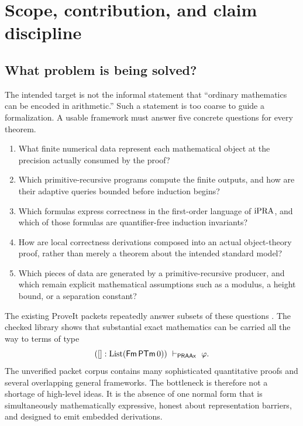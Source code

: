 \section{Scope, contribution, and claim discipline}
\label{sec:scope}

\subsection{What problem is being solved?}

The intended target is not the informal statement that ``ordinary mathematics can be
encoded in arithmetic.''  Such a statement is too coarse to guide a formalization.  A
usable framework must answer five concrete questions for every theorem.

\begin{enumerate}[label=\textbf{Q\arabic*.},leftmargin=3.4em]
\item What finite numerical data represent each mathematical object at the precision
actually consumed by the proof?
\item Which primitive-recursive programs compute the finite outputs, and how are their
adaptive queries bounded before induction begins?
\item Which formulas express correctness in the first-order language of \(\mathrm{iPRA}\), and
which of those formulas are quantifier-free induction invariants?
\item How are local correctness derivations composed into an actual object-theory
proof, rather than merely a theorem about the intended standard model?
\item Which pieces of data are generated by a primitive-recursive producer, and which
remain explicit mathematical assumptions such as a modulus, a height bound, or a
separation constant?
\end{enumerate}

The existing ProveIt packets repeatedly answer subsets of these questions \cite{proveit}.  The
checked  library shows that substantial exact mathematics can be
carried all the way to terms of type
\[
   ([] : \mathrm{List}(\mathsf{Fm}\,\mathsf{PTm}\,0))\ \vdash_{\mathsf{PRAAx}}\ \varphi.
\]
The unverified packet corpus contains many sophisticated quantitative proofs and
several overlapping general frameworks.  The bottleneck is therefore not a shortage
of high-level ideas.  It is the absence of one normal form that is simultaneously
mathematically expressive, honest about representation barriers, and designed to emit
embedded derivations.

